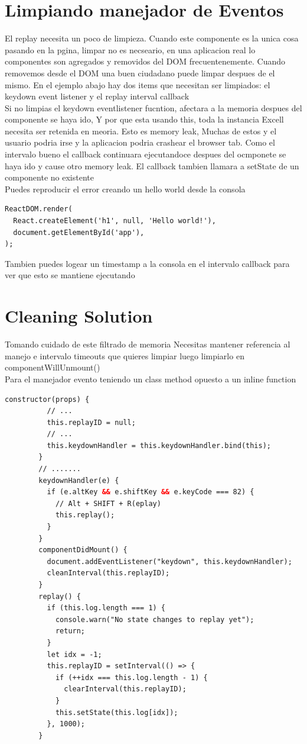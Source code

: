 \section{Limpiando manejador de Eventos}
El replay necesita un poco de limpieza. Cuando este componente es la unica cosa pasando en la pgina, limpar no es necseario, en una aplicacion real lo componentes son agregados y removidos del DOM frecuentenemente. Cuando removemos desde el DOM una buen ciudadano puede limpar despues de el mismo. En el ejemplo abajo hay dos items que necesitan ser limpiados: el keydown event listener y el replay interval callback\\
Si no limpias el keydown eventlistener fucntion, afectara a la memoria despues del componente se haya ido, Y por que esta usando this, toda la instancia Excell necesita ser retenida en meoria. Esto es memory leak, Muchas de estos y el usuario podria irse y la aplicacion podria crashear el browser tab. Como el intervalo bueno el callback continuara ejecutandoce despues del ocmponete se haya ido y cause otro memory leak. El callback tambien llamara a setState de un componente no existente\\
Puedes reproducir el error creando un hello world desde la consola
\begin{lstlisting}[language=html]
ReactDOM.render(
  React.createElement('h1', null, 'Hello world!'),
  document.getElementById('app'),
);
\end{lstlisting}
Tambien puedes logear un timestamp a la consola en el intervalo callback para ver que esto se mantiene ejecutando\\
\section{Cleaning Solution}
Tomando cuidado de este filtrado de memoria Necesitas mantener referencia al manejo e intervalo timeouts que quieres limpiar luego limpiarlo en componentWillUnmount() \\
Para el manejador evento  teniendo un class method opuesto a un inline function
\begin{lstlisting}[language=html]
        constructor(props) {
          // ...
          this.replayID = null;
          // ...
          this.keydownHandler = this.keydownHandler.bind(this);
        }
        // .......
        keydownHandler(e) {
          if (e.altKey && e.shiftKey && e.keyCode === 82) {
            // Alt + SHIFT + R(eplay)
            this.replay();
          }
        }
        componentDidMount() {
          document.addEventListener("keydown", this.keydownHandler);
          cleanInterval(this.replayID);
        }
        replay() {
          if (this.log.length === 1) {
            console.warn("No state changes to replay yet");
            return;
          }
          let idx = -1;
          this.replayID = setInterval(() => {
            if (++idx === this.log.length - 1) {
              clearInterval(this.replayID);
            }
            this.setState(this.log[idx]);
          }, 1000);
        }
\end{lstlisting}
